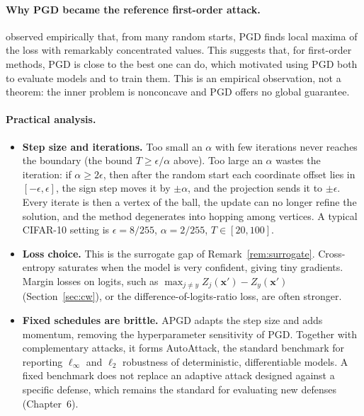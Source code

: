 \documentclass[10pt,a4paper]{extarticle}
\theoremstyle{definition}
\newcommand{\xadv}{\mathbf{x}'}
\begin{document}
\paragraph{Why PGD became the reference first-order attack.} \citet{madry2018towards} observed empirically that, from many random starts, PGD finds local maxima of the loss with remarkably concentrated values. This suggests that, for first-order methods, PGD is close to the best one can do, which motivated using PGD both to evaluate models and to train them. This is an empirical observation, not a theorem: the inner problem is nonconcave and PGD offers no global guarantee.

\paragraph{Practical analysis.}
\begin{itemize}
  \item \textbf{Step size and iterations.} Too small an \(\alpha\) with few iterations never reaches the boundary (the bound \(T\ge\epsilon/\alpha\) above). Too large an \(\alpha\) wastes the iteration: if \(\alpha\ge2\epsilon\), then after the random start each coordinate offset lies in \([-\epsilon,\epsilon]\), the sign step moves it by \(\pm\alpha\), and the projection sends it to \(\pm\epsilon\). Every iterate is then a vertex of the ball, the update can no longer refine the solution, and the method degenerates into hopping among vertices. A typical CIFAR-10 setting is \(\epsilon=8/255\), \(\alpha=2/255\), \(T\in[20,100]\).
  \item \textbf{Loss choice.} This is the surrogate gap of Remark~\ref{rem:surrogate}. Cross-entropy saturates when the model is very confident, giving tiny gradients. Margin losses on logits, such as \(\max_{j\neq y}Z_j(\xadv)-Z_y(\xadv)\) (Section~\ref{sec:cw}), or the difference-of-logits-ratio loss, are often stronger.
  \item \textbf{Fixed schedules are brittle.} APGD \citep{croce2020reliable} adapts the step size and adds momentum, removing the hyperparameter sensitivity of PGD. Together with complementary attacks, it forms AutoAttack, the standard benchmark for reporting \(\ell_\infty\) and \(\ell_2\) robustness of deterministic, differentiable models. A fixed benchmark does not replace an adaptive attack designed against a specific defense, which remains the standard for evaluating new defenses \citep{tramer2020adaptive} (Chapter~6).
\end{itemize}
\end{document}
